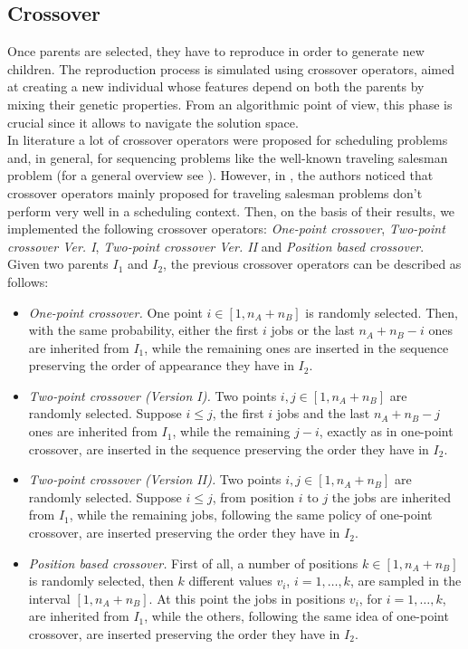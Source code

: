 \documentclass[opre,nonblindrev]{informs3} %
\begin{document}
\subsection{Crossover}
Once parents are selected, they have to reproduce in order to generate new children. The reproduction process is simulated using crossover operators, aimed at creating a new individual whose features depend on both the parents by mixing their genetic properties. From an algorithmic point of view, this phase is crucial since it allows to navigate the solution space. \\
In literature a lot of crossover operators were proposed for scheduling problems and, in general, for sequencing problems like the well-known traveling salesman problem (for a general overview see \cite{cross1}). However, in \cite{sched1}, the authors noticed that crossover operators mainly proposed for traveling salesman problems don't perform very well in a scheduling context. Then, on the basis of their results, we implemented the following crossover operators: \textit{One-point crossover}, \textit{Two-point crossover Ver. I}, \textit{Two-point crossover Ver. II} and \textit{Position based crossover}.\\
Given two parents $I_1$ and $I_2$, the previous crossover operators can be described as follows: 
\begin{itemize}
	\item \textit{One-point crossover.} One point $i \in [1,n_A+n_B]$ is randomly selected. Then, with the same probability, either the first $i$ jobs or the last $n_A+n_B-i$ ones are inherited from $I_1$, while the remaining ones are inserted in the sequence preserving the order of appearance they have in $I_2$. 
	\item \textit{Two-point crossover (Version I).} Two points $i,j \in [1,n_A+n_B]$ are randomly selected. Suppose $i \le j$, the first $i$ jobs and the last $n_A+n_B-j$ ones are inherited from $I_1$, while the remaining $j-i$, exactly as in one-point crossover, are inserted in the sequence preserving the order they have in $I_2$.
	\item \textit{Two-point crossover (Version II).} Two points $i,j \in [1,n_A+n_B]$ are randomly selected. Suppose $i \le j$, from position $i$ to $j$ the jobs are inherited from $I_1$, while the remaining jobs, following the same policy of one-point crossover, are inserted preserving the order they have in $I_2$.
	\item \textit{Position based crossover.} First of all, a number of positions $k \in [1,n_A+n_B]$ is randomly selected, then $k$ different values $v_i$, $i=1,\ldots,k$, are sampled in the interval $[1,n_A+n_B].$ At this point the jobs in positions $v_i$, for $i=1,\ldots,k$, are inherited from $I_1$, while the others, following the same idea of one-point crossover, are inserted preserving the order they have in $I_2$.
\end{itemize}
\end{document}
